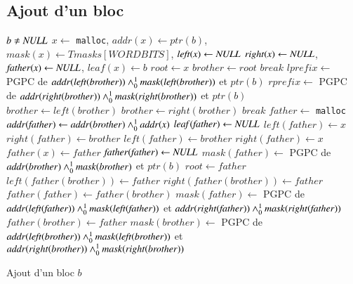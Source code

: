 \subsection{Ajout d'un bloc}


\begin{algorithm}[h!]
\begin{algorithmic}
\Require $b \neq \mathit{NULL}$
\State $\mathit{x} \gets$ \lstinline'malloc',
$\mathit{addr(x)} \gets \mathit{ptr(b)}$,
$\mathit{mask(x)} \gets \mathit{Tmasks[WORDBITS]}$,
$\mathit{left(x)} \gets \mathit{NULL}$
\State $\mathit{right(x)} \gets \mathit{NULL}$,
$\mathit{father(x)} \gets \mathit{NULL}$,
$\mathit{leaf(x)} \gets b$
  \State $\mathit{root} \gets x$
\Else
  \State $\mathit{brother} \gets \mathit{root}$
      \State $\mathit{break}$
    \EndIf
    \State $\mathit{lprefix} \gets$ PGPC de $\mathit{addr(left(brother))} \land_0^1 \mathit{mask(left(brother))}$ et $\mathit{ptr(b)}$
    \State $\mathit{rprefix} \gets$ PGPC de $\mathit{addr(right(brother))} \land_0^1 \mathit{mask(right(brother))}$ et $\mathit{ptr(b)}$
      \State $\mathit{brother} \gets \mathit{left(brother)}$
      \State $\mathit{brother} \gets \mathit{right(brother)}$
    \Else
      \State $\mathit{break}$
    \EndIf
  \EndWhile
  \State $\mathit{father} \gets$ \lstinline'malloc'
  \State $\mathit{addr(father)} \gets \mathit{addr(brother)} \land_0^1 \mathit{addr(x)}$
  \State $\mathit{leaf(father)} \gets \mathit{NULL}$
    \State $\mathit{left(father)} \gets x$
    \State $\mathit{right(father)} \gets \mathit{brother}$
  \Else
    \State $\mathit{left(father)} \gets \mathit{brother}$
    \State $\mathit{right(father)} \gets x$
  \EndIf
  \State $\mathit{father(x)} \gets \mathit{father}$
    \State $\mathit{father(father)} \gets \mathit{NULL}$
    \State $\mathit{mask(father)} \gets$ PGPC de $\mathit{addr(brother)} \land_0^1 \mathit{mask(brother)}$ et $\mathit{ptr(b)}$
    \State $\mathit{root} \gets \mathit{father}$
  \Else
      \State $\mathit{left(father(brother))} \gets \mathit{father}$
    \Else
      \State $\mathit{right(father(brother))} \gets \mathit{father}$
    \EndIf
    \State $\mathit{father(father)} \gets \mathit{father(brother)}$
    \State $\mathit{mask(father)} \gets$ PGPC de $\mathit{addr(left(father))} \land_0^1 \mathit{mask(left(father))}$ et $\mathit{addr(right(father))} \land_0^1 \mathit{mask(right(father))}$
  \EndIf
  \State $\mathit{father(brother)} \gets \mathit{father}$
    \State $\mathit{mask(brother)} \gets$ PGPC de $\mathit{addr(left(brother))} \land_0^1 \mathit{mask(left(brother))}$ et $\mathit{addr(right(brother))} \land_0^1 \mathit{mask(right(brother))}$
  \EndIf
\EndIf
\end{algorithmic}
\caption{Ajout d'un bloc $b$
  \label{algo:add-block}}
\end{algorithm}

